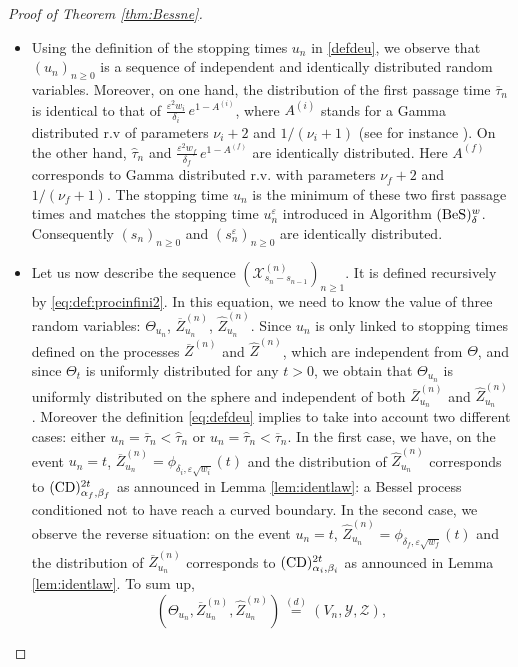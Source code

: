 \documentclass[12pt]{article}
\newcommand{\ai}{A^{(i)}}
\newcommand{\af}{A^{(f)}}
\numberwithin{equation}{section}
\begin{document}
\begin{proof}[Proof of Theorem \ref{thm:Bessne}]
\begin{itemize}
\item Using the definition of the stopping times $u_n$ in \eqref{defdeu}, we observe that $(u_n)_{n\ge 0}$ is a sequence of independent and identically distributed random variables. 
Moreover, on one hand, the distribution of the first passage time $\overline{\tau}_n$ is identical to that of $\frac{\varepsilon^2 w_i}{\delta_i}\,e^{1-\ai}$, where $\ai$ stands for a Gamma distributed r.v of parameters $\nu_i+2$ and $1/(\nu_i+1)$ (see for instance \cite{Deaconu-Herrmann-2017}). 
On the other hand, $\widehat{\tau}_n$ and $\frac{\varepsilon^2 w_f}{\delta_f}\,e^{1-\af}$ are identically distributed. Here $\af$ corresponds to Gamma distributed r.v. with parameters $\nu_f+2$ and $1/(\nu_f+1)$. The stopping time $u_n$ is the minimum of these two first passage times and matches the stopping time $u_n^\varepsilon$ introduced in Algorithm $({\rm BeS})^w_\delta$.
Consequently $(s_n)_{n\ge 0}$ and $(s_n^\varepsilon)_{n\ge 0}$ are identically distributed. 
\item Let us now describe the sequence $(\mathcal{X}^{(n)}_{s_{n}-s_{n-1}})_{n\ge 1}$. It is defined recursively by \eqref{eq:def:procinfini2}. In this equation, we need to know the value of three random variables: $\Theta_{u_{n}}$, $\overline{Z}^{(n)}_{u_{n}}$, $\widehat{Z}^{(n)}_{u_{n}}$. Since $u_n$ is only linked to stopping times defined on the processes $\overline{Z}^{(n)}$ and $\widehat{Z}^{(n)}$, which are independent from $\Theta$, and since $\Theta_t$ is uniformly distributed for any $t>0$, we obtain that $\Theta_{u_{n}}$ is uniformly distributed on the sphere and independent of both $\overline{Z}^{(n)}_{u_{n}}$ and $\widehat{Z}^{(n)}_{u_{n}}$. Moreover the definition \eqref{eq:defdeu} implies to take into account two different cases: either $u_n=\overline{\tau}_n<\widehat{\tau}_n$ or $u_n=\widehat{\tau}_n<\overline{\tau}_n$. In the first case, we have, on the event $u_n=t$, $\overline{Z}^{(n)}_{u_{n}}=\phi_{\delta_i,\varepsilon\sqrt{w_i}}(t)$ and the distribution of $\widehat{Z}^{(n)}_{u_{n}}$ corresponds to $({\rm CD})_{\alpha_f,\beta_f}^{2t}$ as announced in Lemma \ref{lem:identlaw}: a Bessel process conditioned not to have reach a curved boundary. In the second case, we observe the reverse situation: on the event $u_n=t$, $\widehat{Z}^{(n)}_{u_{n}}=\phi_{\delta_f,\varepsilon\sqrt{w_f}}(t)$ and the distribution of $\overline{Z}^{(n)}_{u_{n}}$ corresponds to $({\rm CD})_{\alpha_i,\beta_i}^{2t}$ as announced in Lemma \ref{lem:identlaw}. To sum up, 
\[
(\Theta_{u_{n}}, \overline{Z}^{(n)}_{u_{n}}, \widehat{Z}^{(n)}_{u_{n}})\overset{(d)}{=}(V_n,\mathcal{Y},\mathcal{Z}),
\]
\end{itemize}
\end{proof}
\end{document}
